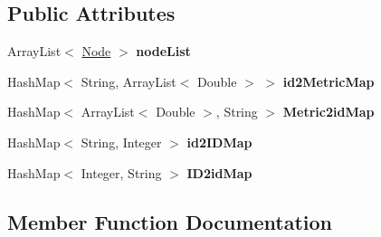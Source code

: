 \subsection*{Public Attributes}
\begin{DoxyCompactItemize}
\item 
\mbox{\label{classedu_1_1uiuc_1_1viz_1_1lattice_1_1_lattice_a1dc505c55585ae789606ef78b2c19328}} 
Array\+List$<$ \mbox{\hyperlink{classedu_1_1uiuc_1_1viz_1_1lattice_1_1_node}{Node}} $>$ {\bfseries node\+List}
\item 
\mbox{\label{classedu_1_1uiuc_1_1viz_1_1lattice_1_1_lattice_a82161dde901282e143ecb162cdb83bee}} 
Hash\+Map$<$ String, Array\+List$<$ Double $>$ $>$ {\bfseries id2\+Metric\+Map}
\item 
\mbox{\label{classedu_1_1uiuc_1_1viz_1_1lattice_1_1_lattice_ad12f116a8ee815bfd9867dac2aa76c67}} 
Hash\+Map$<$ Array\+List$<$ Double $>$, String $>$ {\bfseries Metric2id\+Map}
\item 
\mbox{\label{classedu_1_1uiuc_1_1viz_1_1lattice_1_1_lattice_ae3c5272ff5edadb855415da0a24dd3fb}} 
Hash\+Map$<$ String, Integer $>$ {\bfseries id2\+I\+D\+Map}
\item 
\mbox{\label{classedu_1_1uiuc_1_1viz_1_1lattice_1_1_lattice_a28ba0b41f01b928a94f0de9a6819ade7}} 
Hash\+Map$<$ Integer, String $>$ {\bfseries I\+D2id\+Map}
\end{DoxyCompactItemize}


\subsection{Member Function Documentation}
\mbox{\label{classedu_1_1uiuc_1_1viz_1_1lattice_1_1_lattice_a9561521c4a9067e31306921639af5e19}} 

